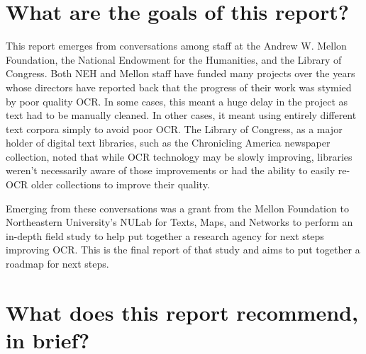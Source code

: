 \documentclass[twoside,11pt]{report}
\begin{document}
\section{What are the goals of this report?}

This report emerges from conversations among staff at the Andrew W. Mellon Foundation, the National Endowment for the Humanities, and the Library of Congress. Both NEH and Mellon staff have funded many projects over the years whose directors have reported back that the progress of their work was stymied by poor quality OCR. In some cases, this meant a huge delay in the project as text had to be manually cleaned. In other cases, it meant using entirely different text corpora simply to avoid poor OCR. The Library of Congress, as a major holder of digital text libraries, such as the Chronicling America newspaper collection, noted that while OCR technology may be slowly improving, libraries weren't necessarily aware of those improvements or had the ability to easily re-OCR older collections to improve their quality.

Emerging from these conversations was a grant from the Mellon Foundation to Northeastern University's NULab for Texts, Maps, and Networks to perform an in-depth field study to help put together a research agency for next steps improving OCR. This is the final report of that study and aims to put together a roadmap for next steps.

\section{What does this report recommend, in brief?}
\end{document}
